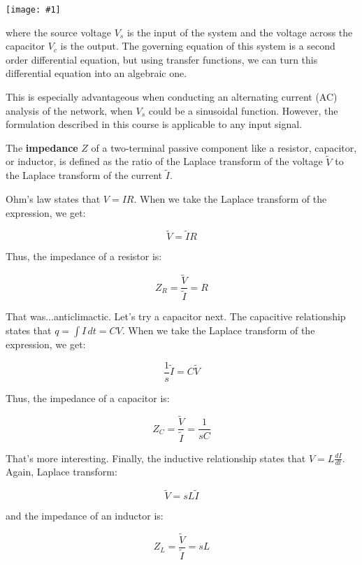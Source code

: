 \documentclass{report}
\newcommand{\bicture}[1]{
\begin{center}
    {\texttt{[image: \#1]}}
\end{center}}
\begin{document}
\begin{onehalfspacing}
\begin{flushleft}
\bicture{6_rlc}

where the source voltage \(V_s\) is the input of the system and the voltage across the capacitor \(V_c\) is the output. The governing equation of this system is a second order differential equation, but using transfer functions, we can turn this differential equation into an algebraic one.

\medskip

This is especially advantageous when conducting an alternating current (AC) analysis of the network, when \(V_s\) could be a sinusoidal function. However, the formulation described in this course is applicable to any input signal.

\medskip

The \textbf{impedance} \(Z\) of a two-terminal passive component like a resistor, capacitor, or inductor, is defined as the ratio of the Laplace transform of the voltage \(\tilde{V}\) to the Laplace transform of the current \(\tilde{I}\).

\medskip

Ohm's law states that \(V = IR\). When we take the Laplace transform of the expression, we get:

\vspace{-0.1in}
\[\tilde{V} = \tilde{I} R\]

Thus, the impedance of a resistor is:

\vspace{-0.1in}
\[Z_R = \frac{\tilde{V}}{\tilde{I}} = R\]

That was...anticlimactic. Let's try a capacitor next. The capacitive relationship states that \(q = \int I \, dt = CV\). When we take the Laplace transform of the expression, we get:

\vspace{-0.1in}
\[\frac{1}{s} \tilde{I} = C\tilde{V}\]

Thus, the impedance of a capacitor is:

\vspace{-0.1in}
\[Z_C = \frac{\tilde{V}}{\tilde{I}} = \frac{1}{sC}\]

That's more interesting. Finally, the inductive relationship states that \(V = L\frac{dI}{dt}\). Again, Laplace transform:

\vspace{-0.1in}
\[\tilde{V} = s L\tilde{I}\]

and the impedance of an inductor is:

\vspace{-0.1in}
\[Z_L = \frac{\tilde{V}}{\tilde{I}} = sL\]


\end{flushleft}
\end{onehalfspacing}
\end{document}
